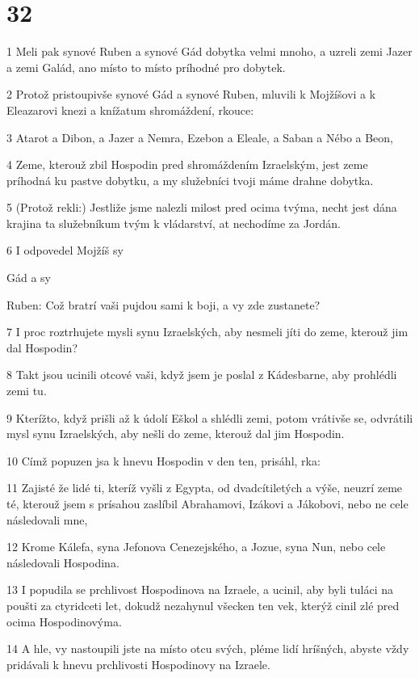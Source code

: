 \chapter{32}

\par 1 Meli pak synové Ruben a synové Gád dobytka velmi mnoho, a uzreli zemi Jazer a zemi Galád, ano místo to místo príhodné pro dobytek.
\par 2 Protož pristoupivše synové Gád a synové Ruben, mluvili k Mojžíšovi a k Eleazarovi knezi a knížatum shromáždení, rkouce:
\par 3 Atarot a Dibon, a Jazer a Nemra, Ezebon a Eleale, a Saban a Nébo a Beon,
\par 4 Zeme, kterouž zbil Hospodin pred shromáždením Izraelským, jest zeme príhodná ku pastve dobytku, a my služebníci tvoji máme drahne dobytka.
\par 5 (Protož rekli:) Jestliže jsme nalezli milost pred ocima tvýma, necht jest dána krajina ta služebníkum tvým k vládarství, at nechodíme za Jordán.
\par 6 I odpovedel Mojžíš sy\par Gád a sy\par Ruben: Což bratrí vaši pujdou sami k boji, a vy zde zustanete?
\par 7 I proc roztrhujete mysli synu Izraelských, aby nesmeli jíti do zeme, kterouž jim dal Hospodin?
\par 8 Takt jsou ucinili otcové vaši, když jsem je poslal z Kádesbarne, aby prohlédli zemi tu.
\par 9 Kterížto, když prišli až k údolí Eškol a shlédli zemi, potom vrátivše se, odvrátili mysl synu Izraelských, aby nešli do zeme, kterouž dal jim Hospodin.
\par 10 Címž popuzen jsa k hnevu Hospodin v den ten, prisáhl, rka:
\par 11 Zajisté že lidé ti, kteríž vyšli z Egypta, od dvadcítiletých a výše, neuzrí zeme té, kterouž jsem s prísahou zaslíbil Abrahamovi, Izákovi a Jákobovi, nebo ne cele následovali mne,
\par 12 Krome Kálefa, syna Jefonova Cenezejského, a Jozue, syna Nun, nebo cele následovali Hospodina.
\par 13 I popudila se prchlivost Hospodinova na Izraele, a ucinil, aby byli tuláci na poušti za ctyridceti let, dokudž nezahynul všecken ten vek, kterýž cinil zlé pred ocima Hospodinovýma.
\par 14 A hle, vy nastoupili jste na místo otcu svých, pléme lidí hríšných, abyste vždy pridávali k hnevu prchlivosti Hospodinovy na Izraele.
